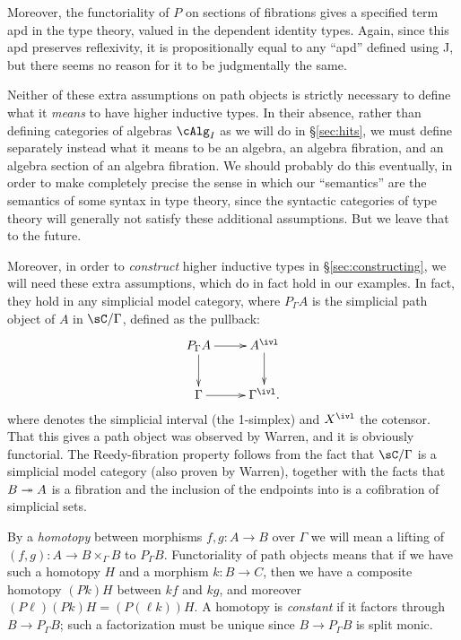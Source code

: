 \documentclass{amsart}
\begin{document}
Moreover, the functoriality of $P$ on sections of fibrations gives a specified term \textsf{apd} in the type theory, valued in the dependent identity types.
Again, since this \textsf{apd} preserves reflexivity, it is propositionally equal to any ``\textsf{apd}'' defined using \textsf{J}, but there seems no reason for it to be judgmentally the same.

Neither of these extra assumptions on path objects is strictly necessary to define what it \emph{means} to have higher inductive types.
In their absence, rather than defining categories of algebras $\cAlg_I$ as we will do in \S\ref{sec:hits}, we must define separately instead what it means to be an algebra, an algebra fibration, and an algebra section of an algebra fibration.
We should probably do this eventually, in order to make completely precise the sense in which our ``semantics'' are the semantics of some syntax in type theory, since the syntactic categories of type theory will generally not satisfy these additional assumptions.
But we leave that to the future.

Moreover, in order to \emph{construct} higher inductive types in \S\ref{sec:constructing}, we will need these extra assumptions, which do in fact hold in our examples.
In fact, they hold in any simplicial model category, where $P_\Gamma A$ is the simplicial path object of $A$ in $\sC/\Gamma$, defined as the pullback:
\begin{equation}
  \vcenter{\xymatrix{
      P_\Gamma A\ar[r]\ar[d] &
      A^{\ivl}\ar[d]\\
      \Gamma\ar[r] &
      \Gamma^{\ivl}.
      }}
\end{equation}
where \ivl denotes the simplicial interval (the 1-simplex) and $X^\ivl$ the cotensor.
That this gives a path object was observed by Warren, and it is obviously functorial.
The Reedy-fibration property follows from the fact that $\sC/\Gamma$ is a simplicial model category (also proven by Warren), together with the facts that $B\twoheadrightarrow A$ is a fibration and the inclusion of the endpoints into \ivl is a cofibration of simplicial sets.

By a \emph{homotopy} between morphisms $f,g:A\to B$ over $\Gamma$ we will mean a lifting of $(f,g):A\to B\times_\Gamma B$ to $P_\Gamma B$.
Functoriality of path objects means that if we have such a homotopy $H$ and a morphism $k:B\to C$, then we have a composite homotopy $(Pk)H$ between $kf$ and $kg$, and moreover $(P\ell)(Pk)H = (P(\ell k))H$.
A homotopy is \emph{constant} if it factors through $B\to P_\Gamma B$; such a factorization must be unique since $B\to P_\Gamma B$ is split monic.
\end{document}
